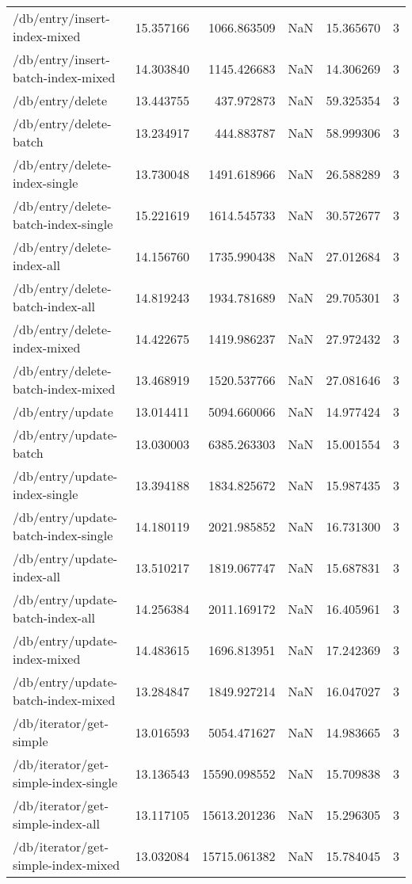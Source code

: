 \begin{longtable}{lrrrrr}
/db/entry/insert-index-mixed & 15.357166 & 1066.863509 & NaN & 15.365670 & 3 \\
/db/entry/insert-batch-index-mixed & 14.303840 & 1145.426683 & NaN & 14.306269 & 3 \\
/db/entry/delete & 13.443755 & 437.972873 & NaN & 59.325354 & 3 \\
/db/entry/delete-batch & 13.234917 & 444.883787 & NaN & 58.999306 & 3 \\
/db/entry/delete-index-single & 13.730048 & 1491.618966 & NaN & 26.588289 & 3 \\
/db/entry/delete-batch-index-single & 15.221619 & 1614.545733 & NaN & 30.572677 & 3 \\
/db/entry/delete-index-all & 14.156760 & 1735.990438 & NaN & 27.012684 & 3 \\
/db/entry/delete-batch-index-all & 14.819243 & 1934.781689 & NaN & 29.705301 & 3 \\
/db/entry/delete-index-mixed & 14.422675 & 1419.986237 & NaN & 27.972432 & 3 \\
/db/entry/delete-batch-index-mixed & 13.468919 & 1520.537766 & NaN & 27.081646 & 3 \\
/db/entry/update & 13.014411 & 5094.660066 & NaN & 14.977424 & 3 \\
/db/entry/update-batch & 13.030003 & 6385.263303 & NaN & 15.001554 & 3 \\
/db/entry/update-index-single & 13.394188 & 1834.825672 & NaN & 15.987435 & 3 \\
/db/entry/update-batch-index-single & 14.180119 & 2021.985852 & NaN & 16.731300 & 3 \\
/db/entry/update-index-all & 13.510217 & 1819.067747 & NaN & 15.687831 & 3 \\
/db/entry/update-batch-index-all & 14.256384 & 2011.169172 & NaN & 16.405961 & 3 \\
/db/entry/update-index-mixed & 14.483615 & 1696.813951 & NaN & 17.242369 & 3 \\
/db/entry/update-batch-index-mixed & 13.284847 & 1849.927214 & NaN & 16.047027 & 3 \\
/db/iterator/get-simple & 13.016593 & 5054.471627 & NaN & 14.983665 & 3 \\
/db/iterator/get-simple-index-single & 13.136543 & 15590.098552 & NaN & 15.709838 & 3 \\
/db/iterator/get-simple-index-all & 13.117105 & 15613.201236 & NaN & 15.296305 & 3 \\
/db/iterator/get-simple-index-mixed & 13.032084 & 15715.061382 & NaN & 15.784045 & 3 \\

\end{longtable}
